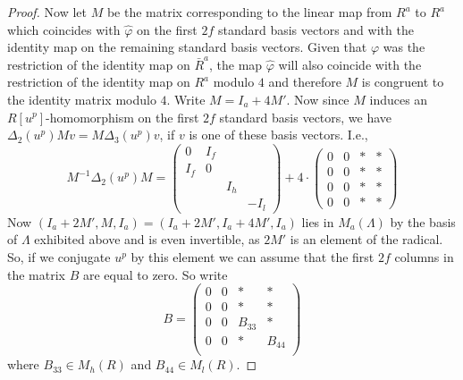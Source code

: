 \documentclass[11pt, a4paper]{amsart}
\theoremstyle{definition}
\theoremstyle{definition}
\begin{document}
\begin{proof}
    Now let $M$ be the matrix corresponding to the linear map from $R^a$ to $R^a$ which coincides with $\hat \varphi$ on the first $2f$ standard basis vectors and with the identity map on the remaining standard basis vectors.  Given that $\varphi$ was the restriction of the identity map on $\bar R^a$, the map $\hat \varphi$ will also coincide with the restriction of the identity map on $R^a$ modulo $4$ and therefore $M$ is congruent to the identity matrix modulo $4$. Write $M=I_a+4M'$. Now since $M$ induces an $R[u^p]$-homomorphism on the first $2f$ standard basis vectors, we have $\Delta_2(u^p)Mv = M\Delta_3(u^p)v$, if $v$ is one of these basis vectors. I.e.,
    \begin{equation}
        M^{-1}\Delta_2(u^p)M= \left(\begin{array}{cccc} 0&I_f \\ I_f&0\\&&I_h \\&&&-I_l \end{array}\right) + 4\cdot \left(\begin{array}{cccc} 0&0&*&* \\ 0&0&*&*\\0&0&*&* \\0&0&*&* \end{array}\right) 
    \end{equation}
    Now $(I_a + 2M', M, I_a) = (I_a+2M', I_a+4M', I_a)$ lies in $M_a(\Lambda)$ by the basis of $\Lambda$ exhibited above and is even invertible, as $2M'$ is an element of the radical. So, if we conjugate $u^p$ by this element we can assume that the first $2f$ columns in the matrix $B$ are equal to zero. So write 
    \begin{equation}
    B=\left(\begin{array}{cccc} 0 & 0 & * & * \\ 0 & 0 & * & *\\  0 & 0 & B_{33} & * \\  0 & 0 & * & B_{44} \\ \end{array}\right)
    \end{equation}
    where $B_{33} \in M_h(R)$ and $B_{44}\in M_{l}(R)$.


\end{proof}
\end{document}
